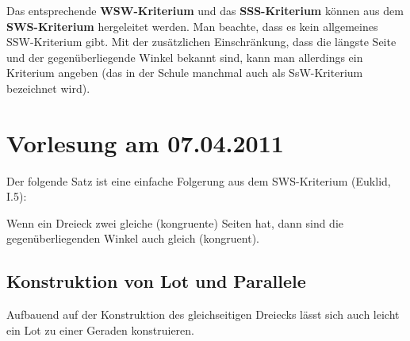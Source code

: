 \medskip

Das entsprechende {\bf WSW-Kriterium} und das {\bf SSS-Kriterium} 
können aus dem  {\bf SWS-Kriterium} hergeleitet werden. 
Man beachte, dass es kein allgemeines SSW-Kriterium gibt.
Mit der zusätzlichen Einschränkung, dass die längste Seite und der
gegenüberliegende Winkel bekannt sind, kann man allerdings ein
Kriterium angeben (das in der Schule manchmal auch als 
SsW-Kriterium bezeichnet wird).






\section*{Vorlesung am 07.04.2011}



Der folgende Satz ist eine einfache Folgerung aus dem SWS-Kriterium
(Euklid, I.5):

\begin{thm}
Wenn ein Dreieck zwei gleiche (kongruente) Seiten hat, dann sind die
gegenüberliegenden Winkel auch gleich (kongruent).
\end{thm}






\subsection*{Konstruktion von Lot und Parallele}

Aufbauend auf der Konstruktion des gleichseitigen Dreiecks lässt sich
auch leicht ein Lot zu einer Geraden konstruieren.


